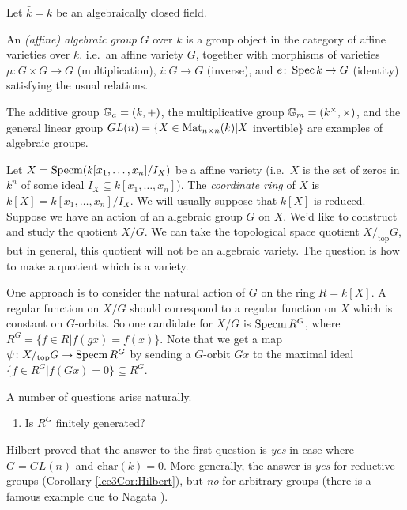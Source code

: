 
Let $\bar k=k$ be an algebraically closed field.

\begin{definition}
 An \emph{(affine) algebraic group} $G$ over $k$ is a group object in the category of affine varieties over $k$. i.e.~an affine variety $G$, together with morphisms of varieties $\mu\colon G\times G\to G$ (multiplication), $i\colon G\to G$ (inverse), and $e\colon \operatorname{Spec} k\to G$ (identity) satisfying the usual relations.
\end{definition}

\begin{example}
 The additive group $\mathbb{G}_a=(k,+)$, the multiplicative group $\mathbb{G}_m=(k^\times,\times)$, and the general linear group $GL(n)=\{X\in \operatorname{Mat}_{n\times n}(k)| X$ invertible$\}$ are examples of algebraic groups.
\end{example}

Let $X=\operatorname{Specm}(k[x_1,\dots,x_n]/I_X)$ be a affine variety (i.e.~$X$ is the set of zeros in $k^n$ of some ideal $I_X\subseteq k[x_1,\dots, x_n]$). The \emph{coordinate ring} of $X$ is $k[X] = k[x_1,\dots,x_n]/I_X$. We will usually suppose that $k[X]$ is reduced. Suppose we have an action of an algebraic group $G$ on $X$. We'd like to construct and study the quotient $X/G$. We can take the topological space quotient $X/_\text{top}G$, but in general, this quotient will not be an algebraic variety. The question is how to make a quotient which is a variety.

One approach is to consider the natural action of $G$ on the ring $R=k[X]$. A regular function on $X/G$ should correspond to a regular function on $X$ which is constant on $G$-orbits. So one candidate for $X/G$ is $\operatorname{Specm} R^G$, where $R^G=\{f\in R|f(gx)=f(x)\}$. Note that we get a map $\psi\colon X/_\text{top}G\to \operatorname{Specm} R^G$ by sending a $G$-orbit $G x$ to the maximal ideal $\{f\in R^G|f(G x)=0\}\subseteq R^G$.

A number of questions arise naturally.
\begin{enumerate}
 \item Is $R^G$ finitely generated?
\end{enumerate}
Hilbert proved that the answer to the first question is \emph{yes} in case where $G=GL(n)$ and $\mathrm{char}(k)=0$. More generally, the answer is \emph{yes} for reductive groups (Corollary \ref{lec3Cor:Hilbert}), but \emph{no} for arbitrary groups (there is a famous example due to Nagata ).

